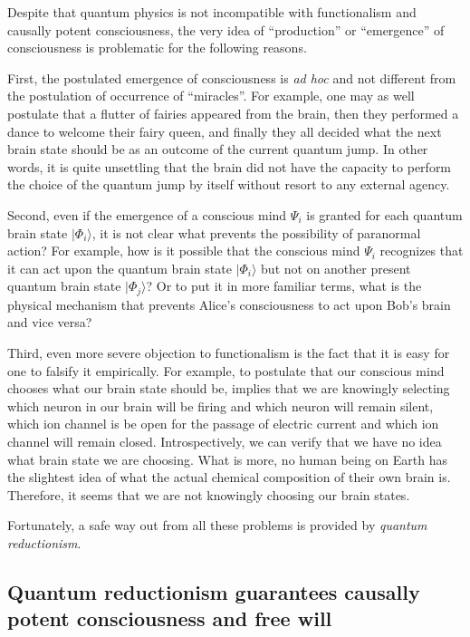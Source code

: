 \documentclass{ws-ijmpb}
\begin{document}
Despite that quantum physics is not incompatible with functionalism and causally potent consciousness, the very idea of ``production'' or ``emergence'' of consciousness is problematic for the following reasons.

First, the postulated emergence of consciousness is \emph{ad hoc}
and not different from the postulation of occurrence of ``miracles''.
For example, one may as well postulate that a flutter of fairies appeared
from the brain, then they performed a dance to welcome their fairy
queen, and finally they all decided what the next brain state should
be as an outcome of the current quantum jump. In other words, it is
quite unsettling that the brain did not have the capacity to perform
the choice of the quantum jump by itself without resort to any external
agency.

Second, even if the emergence of a conscious mind $\Psi_{i}$ is granted
for each quantum brain state $\vert \Phi_{i}\rangle$, it is not clear
what prevents the possibility of paranormal action? For example, how
is it possible that the conscious mind $\Psi_{i}$ recognizes that
it can act upon the quantum brain state $\vert \Phi_{i}\rangle$ but not
on another present quantum brain state $\vert \Phi_{j}\rangle$? Or to
put it in more familiar terms, what is the physical mechanism that
prevents Alice's consciousness to act upon Bob's brain and vice versa?

Third, even more severe objection to functionalism is the fact that
it is easy for one to falsify it empirically. For example, to postulate
that our conscious mind chooses what our brain state should be, implies
that we are knowingly selecting which neuron in our brain will be
firing and which neuron will remain silent, which ion channel is be
open for the passage of electric current and which ion channel will
remain closed. Introspectively, we can verify that we have no idea
what brain state we are choosing. What is more, no human being on
Earth has the slightest idea of what the actual chemical composition
of their own brain is. Therefore, it seems that we are not knowingly
choosing our brain states.

Fortunately, a safe way out from all these problems is provided by
\emph{quantum reductionism}.


\subsection{Quantum reductionism guarantees causally potent consciousness and free will}
\label{sub:42}
\end{document}
